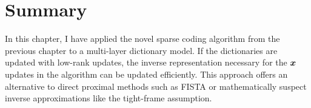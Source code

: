 \section{Summary}
In this chapter, I have applied the novel sparse coding algorithm from the previous chapter to a multi-layer dictionary model. If the dictionaries are updated with low-rank updates, the inverse representation necessary for the $\bm{x}$ updates in the algorithm can be updated efficiently. This approach offers an alternative to direct proximal methods such as FISTA or mathematically suspect inverse approximations like the tight-frame assumption.

